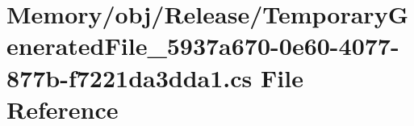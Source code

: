 \hypertarget{_memory_2obj_2_release_2_temporary_generated_file__5937a670-0e60-4077-877b-f7221da3dda1_8cs}{}\section{Memory/obj/\+Release/\+Temporary\+Generated\+File\+\_\+5937a670-\/0e60-\/4077-\/877b-\/f7221da3dda1.cs File Reference}
\label{_memory_2obj_2_release_2_temporary_generated_file__5937a670-0e60-4077-877b-f7221da3dda1_8cs}
